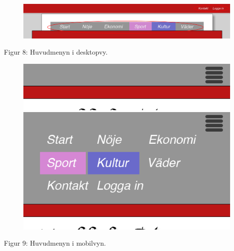 \documentclass[11pt]{article}
\begin{document}
\begin{figure}[H]
\centerline{%
\includegraphics[scale=0.4]{pics/menydesktop.png}\\
}
\end{figure}
\hspace{0.5cm}Figur 8: Huvudmenyn i desktopvy.

\begin{figure}[H]
\centerline{%
\includegraphics[scale=0.6]{pics/menymobil.png}\hspace{2em}%
\includegraphics[scale=0.35]{pics/menymobilopen.png}%
}
\end{figure}
\hspace{0.5cm}Figur 9: Huvudmenyn i mobilvyn.
\end{document}
